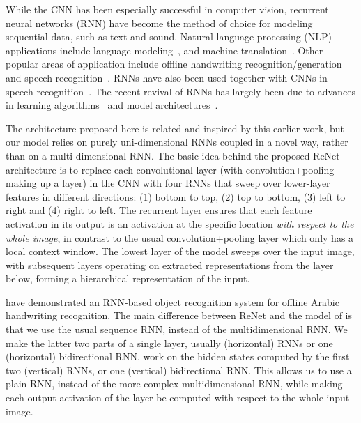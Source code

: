 \documentclass{article} \usepackage{nips15submit_e,times}
\begin{document}
While the CNN has been especially successful in computer vision, recurrent
neural networks (RNN) have become the method of choice for modeling sequential
data, such as text and sound. Natural language processing (NLP) applications
include language modeling~\citep[see, e.g.,][]{Mikolov-thesis-2012}, and machine
translation~\citep{Sutskever-et-al-NIPS2014,Cho2014,bahdanau2014neural}.  Other
popular areas of application include offline handwriting
recognition/generation~\citep{Graves+Schmidhuber-2009,Graves-et-al-NIPS2007,Graves-arxiv2013}
and speech recognition~\citep{Chorowski-et-al-arxiv2014,Graves+Jaitly-ICML2014}.
RNNs have also been used together with CNNs in speech
recognition~\citep{sainath2015}.  The recent revival of RNNs has largely been
due to advances in learning
algorithms~\citep{Pascanu+al-ICML2013-small,Martens+Sutskever-ICML2011} and
model
architectures~\citep{Pascanu-et-al-ICLR2014,Hochreiter+Schmidhuber-1997,Cho2014}.



The architecture proposed here is
related and inspired by this earlier work, but our model relies on purely
uni-dimensional RNNs coupled in a novel way, rather than on a multi-dimensional
RNN. The basic idea behind the proposed ReNet architecture is to replace each
convolutional layer (with convolution+pooling making up a layer) in the CNN with
four RNNs that sweep over lower-layer features in different directions: (1)
bottom to top, (2) top to bottom, (3) left to right and (4) right to left.
The recurrent layer ensures that each feature activation in its output is an
activation at the specific location \emph{with respect to the whole image}, in
contrast to the usual convolution+pooling layer which only has a local context
window.  The lowest layer of the model sweeps over the input image, with
subsequent layers operating on extracted representations from the layer below,
forming a hierarchical representation of the input.

\citet{Graves+Schmidhuber-2009} have demonstrated an RNN-based object
recognition system for offline Arabic handwriting recognition.  The main
difference between ReNet and the model of \citet{Graves+Schmidhuber-2009} is
that we use the usual sequence RNN, instead of the multidimensional RNN. We make
the latter two parts of a single layer, usually (horizontal) RNNs or one
(horizontal) bidirectional RNN, work on the hidden states computed by the first
two (vertical) RNNs, or one (vertical) bidirectional RNN. This allows us to use
a plain RNN, instead of the more complex multidimensional RNN, while making each
output activation of the layer be computed with respect to the whole input
image.  
\end{document}
